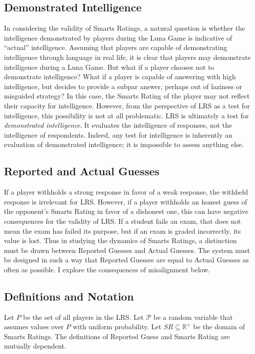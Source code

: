 \subsection{Demonstrated Intelligence}

In considering the validity of Smarts Ratings, a natural question is whether the intelligence demonstrated by players during the Luna Game is indicative of ``actual'' intelligence. Assuming that players are capable of demonstrating intelligence through language in real life, it is clear that players may demonstrate intelligence during a Luna Game. But what if a player chooses not to demonstrate intelligence? What if a player is capable of answering with high intelligence, but decides to provide a subpar answer, perhaps out of laziness or misguided strategy? In this case, the Smarts Rating of the player may not reflect their capacity for intelligence. However, from the perspective of LRS as a test for intelligence, this possibility is not at all problematic. LRS is ultimately a test for \textit{demonstrated intelligence}. It evaluates the intelligence of responses, not the intelligence of respondents. Indeed, any test for intelligence is inherently an evaluation of demonstrated intelligence; it is impossible to assess anything else. 

\subsection{Reported and Actual Guesses}

If a player withholds a strong response in favor of a weak response, the withheld response is irrelevant for LRS. However, if a player withholds an honest guess of the opponent's Smarts Rating in favor of a dishonest one, this can have negative consequences for the validity of LRS. If a student fails an exam, that does not mean the exam has failed its purpose, but if an exam is graded incorrectly, its value is lost. Thus in studying the dynamics of Smarts Ratings, a distinction must be drawn between Reported Guesses and Actual Guesses. The system must be designed in such a way that Reported Guesses are equal to Actual Guesses as often as possible. I explore the consequences of misalignment below.


\subsection{Definitions and Notation}

Let $P$ be the set of all players in the LRS. Let $\mathcal{P}$ be a random variable that assumes values over $P$ with uniform probability. Let $SR \subseteq \mathbb{R}^+$ be the domain of Smarts Ratings. The definitions of Reported Guess and Smarts Rating are mutually dependent.

